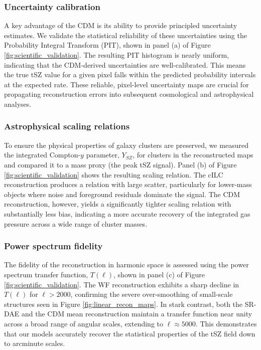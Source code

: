 \documentclass[]{article}
\begin{document}
\subsubsection{Uncertainty calibration}
A key advantage of the CDM is its ability to provide principled uncertainty estimates. We validate the statistical reliability of these uncertainties using the Probability Integral Transform (PIT), shown in panel (a) of Figure \ref{fig:scientific_validation}. The resulting PIT histogram is nearly uniform, indicating that the CDM-derived uncertainties are well-calibrated. This means the true tSZ value for a given pixel falls within the predicted probability intervals at the expected rate. These reliable, pixel-level uncertainty maps are crucial for propagating reconstruction errors into subsequent cosmological and astrophysical analyses.

\subsubsection{Astrophysical scaling relations}
To ensure the physical properties of galaxy clusters are preserved, we measured the integrated Compton-$y$ parameter, $Y_{SZ}$, for clusters in the reconstructed maps and compared it to a mass proxy (the peak tSZ signal). Panel (b) of Figure \ref{fig:scientific_validation} shows the resulting scaling relation. The cILC reconstruction produces a relation with large scatter, particularly for lower-mass objects where noise and foreground residuals dominate the signal. The CDM reconstruction, however, yields a significantly tighter scaling relation with substantially less bias, indicating a more accurate recovery of the integrated gas pressure across a wide range of cluster masses.

\subsubsection{Power spectrum fidelity}
The fidelity of the reconstruction in harmonic space is assessed using the power spectrum transfer function, $T(\ell)$, shown in panel (c) of Figure \ref{fig:scientific_validation}. The WF reconstruction exhibits a sharp decline in $T(\ell)$ for $\ell > 2000$, confirming the severe over-smoothing of small-scale structures seen in Figure \ref{fig:linear_recon_maps}. In stark contrast, both the SR-DAE and the CDM mean reconstruction maintain a transfer function near unity across a broad range of angular scales, extending to $\ell \approx 5000$. This demonstrates that our models accurately recover the statistical properties of the tSZ field down to arcminute scales.
\end{document}
